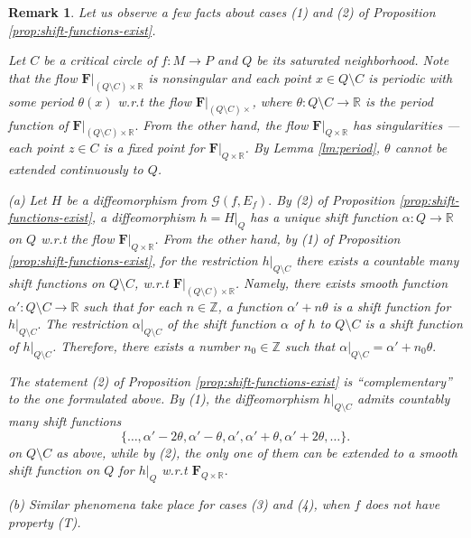 \documentclass[10pt,reqno]{amsart}
\newtheorem{remark}[subsection]{Remark}
\newcommand{\bbR}{\mathbb{R}}
\newcommand{\bbZ}{\mathbb{Z}}
\newcommand{\bfF}{\mathbf{F}}
\begin{document}
{
\begin{remark}
	{\rm 	
	 Let us observe a few facts about cases (1) and (2) of Proposition \ref{prop:shift-functions-exist}. 
	 
	 Let $C$ be a critical circle of $f:M\to P$ and $Q$ be its saturated neighborhood. Note that the flow $\bfF|_{(Q\setminus C)\times \bbR}$ is nonsingular and each point $x\in Q\setminus C$ is periodic with some period $\theta(x)$ w.r.t the flow $\bfF|_{(Q\setminus C)\times}$, where $\theta:Q\setminus C\to \bbR$ is the period function of $\bfF|_{(Q\setminus C)\times \bbR}.$ From the other hand, the flow $\bfF|_{Q\times\bbR}$ has singularities --- each point $z\in C$ is a fixed point for $\bfF|_{Q\times \bbR}$.
	 By Lemma \ref{lm:period}, $\theta$ cannot be extended continuously to $Q$.
	 
	 
	 (a) Let $H$ be a diffeomorphism from $\mathcal{G}(f,E_f).$ By (2) of Proposition \ref{prop:shift-functions-exist}, a diffeomorphism $h = H|_Q$ has a unique shift function $\alpha:Q\to \bbR$ on $Q$ w.r.t the flow $\bfF|_{Q\times\bbR}$. From the other hand, by (1) of Proposition \ref{prop:shift-functions-exist}, for the restriction $h|_{Q\setminus C}$ there exists a countable many shift functions  on $Q\setminus C$, w.r.t $\bfF|_{(Q\setminus C)\times\bbR}$. Namely, there exists smooth function $\alpha':Q\setminus C\to \bbR$ such that for each $n\in \bbZ$, a function $\alpha'+n\theta$ is a shift function for $h|_{Q\setminus C}.$
	 The restriction $\alpha|_{Q\setminus C}$ of the shift function $\alpha$ of $h$  to $Q\setminus C$ is a shift function of $h|_{Q\setminus C}$. Therefore, there exists a number $n_0\in \bbZ$ such that $\alpha|_{Q\setminus C} = \alpha'+n_0\theta.$ 	
	 
	 The statement (2) of Proposition  \ref{prop:shift-functions-exist} is ``complementary'' to the one formulated above. By (1), the diffeomorphism $h|_{Q\setminus C}$ admits countably many shift functions 
	 $$
	 \{\ldots, \alpha'-2\theta, \alpha'-\theta, \alpha', \alpha'+\theta, \alpha'+2\theta, \ldots\}.
	 $$
	 on $Q\setminus C$ as above, while by (2),  {\it the only one} of them  can be extended to a smooth shift function on $Q$ for $h|_{Q}$ w.r.t $\bfF_{Q\times\bbR}.$
	 
	 (b) Similar phenomena take place for cases (3) and (4), when $f$ does not have property (T).
}
\end{remark}
}
\end{document}
